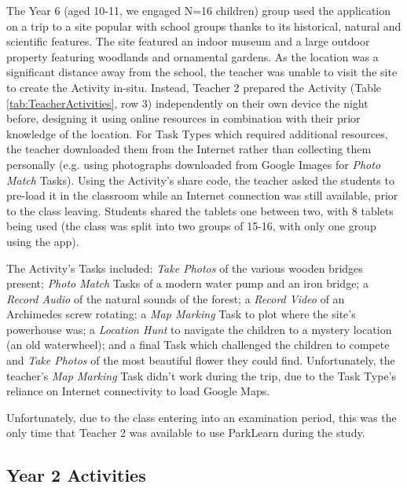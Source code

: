 The Year 6 (aged 10-11, we engaged N=16 children) group used the application on a trip to a site popular with school groups thanks to its historical, natural and scientific features. The site featured an indoor museum and a large outdoor property featuring woodlands and ornamental gardens. As the location was a significant distance away from the school, the teacher was unable to visit the site to create the Activity in-situ. Instead, Teacher 2 prepared the Activity (Table \ref{tab:TeacherActivities}, row 3) independently on their own device the night before, designing it using online resources in combination with their prior knowledge of the location. For Task Types which required additional resources, the teacher downloaded them from the Internet rather than collecting them personally (e.g. using photographs downloaded from Google Images for \textit{Photo Match} Tasks). Using the Activity's share code, the teacher asked the students to pre-load it in the classroom while an Internet connection was still available, prior to the class leaving. Students shared the tablets one between two, with 8 tablets being used (the class was split into two groups of 15-16, with only one group using the app). 

The Activity's Tasks included: \textit{Take Photos} of the various wooden bridges present; \textit{Photo Match} Tasks of a modern water pump and an iron bridge; a \textit{Record Audio} of the natural sounds of the forest; a \textit{Record Video} of an Archimedes screw rotating; a \textit{Map Marking} Task to plot where the site's powerhouse was; a \textit{Location Hunt} to navigate the children to a mystery location (an old waterwheel); and a final Task which challenged the children to compete and \textit{Take Photos} of the most beautiful flower they could find. Unfortunately, the teacher's \textit{Map Marking} Task didn't work during the trip, due to the Task Type's reliance on Internet connectivity to load Google Maps.

Unfortunately, due to the class entering into an examination period, this was the only time that Teacher 2 was available to use ParkLearn during the study.

\subsection{Year 2 Activities}

